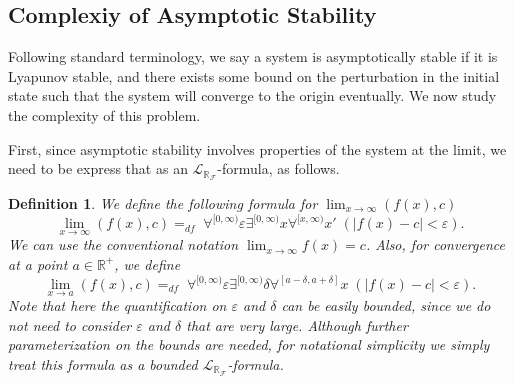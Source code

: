 \documentclass[12pt]{article}
\theoremstyle{plain}
\newtheorem{definition}[theorem]{Definition}
\theoremstyle{definition}
\newcommand{\lrf}{\mathcal{L}_{\mathbb{R}_{\mathcal{F}}}}
\begin{document}
\subsection{Complexiy of Asymptotic Stability}

Following standard terminology, we say a system is asymptotically stable if it is Lyapunov stable, and there exists some bound on the perturbation in the initial state such that the system will converge to the origin eventually. We now study the complexity of this problem.

First, since asymptotic stability involves properties of the system at the limit, we need to be express that as an $\lrf$-formula, as follows.
\begin{definition}
We define the following formula for $\lim_{x\rightarrow \infty}(f(x), c)$
$$\lim_{x\rightarrow \infty}(f(x), c) =_{df}\; \forall^{[0,\infty)} \varepsilon \exists^{[0,\infty)} x \forall^{[x,\infty)}x'  \; (|f(x) - c|<\varepsilon).$$
We can use the conventional notation $\lim_{x\rightarrow \infty} f(x) = c$. Also, for convergence at a point $a\in \mathbb{R}^+$, we define
$$\lim_{x\rightarrow a}(f(x), c) =_{df}\; \forall^{[0,\infty)} \varepsilon \exists^{[0,\infty)} \delta \forall^{[a-\delta,a+\delta]}x  \; (|f(x) - c|<\varepsilon).$$
Note that here the quantification on $\varepsilon$ and $\delta$ can be easily bounded, since we do not need to consider $\varepsilon$ and $\delta$ that are very large. Although further parameterization on the bounds are needed, for notational simplicity we simply treat this formula as a bounded $\lrf$-formula.
\end{definition}
\end{document}
